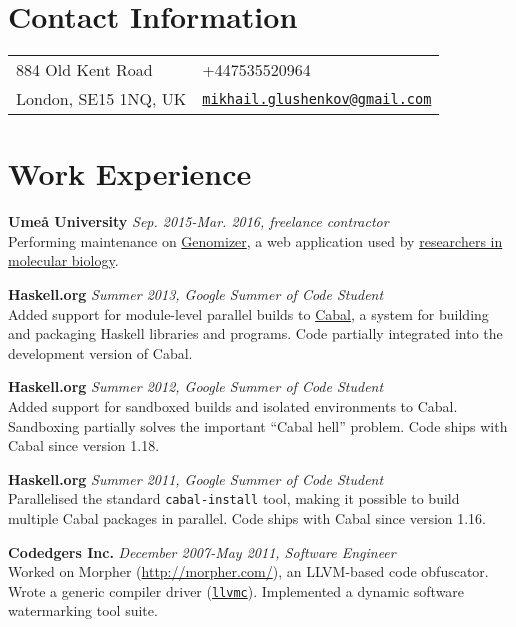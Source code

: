 \documentclass[margin,line]{res}
\begin{document}

\begin{resume}
\section{\sc Contact Information}
\vspace{.05in}
\begin{tabular}{@{}p{2in}p{4in}}
884 Old Kent Road&
+447535520964\\
London, SE15 1NQ, UK&
\href{mailto:mikhail.glushenkov@gmail.com}
{\texttt{mikhail.glushenkov@gmail.com}}\\
\end{tabular}

\section{\sc Work Experience}

{\bf Umeå University} \hfill {\it Sep. 2015-Mar. 2016, freelance contractor}\\
Performing maintenance on \href{https://github.com/genomizer}{Genomizer}, a web
application used by \href{http://www.epicon.nu}{researchers in molecular biology}.

{\bf Haskell.org} \hfill {\it Summer 2013, Google Summer of Code Student}\\
Added support for module-level parallel builds to
\href{http://haskell.org/cabal}{Cabal}, a system for building and packaging
Haskell libraries and programs. Code partially integrated into the development
version of Cabal.

{\bf Haskell.org} \hfill {\it Summer 2012, Google Summer of Code Student}\\
Added support for sandboxed builds and isolated environments to
Cabal. Sandboxing partially solves the important ``Cabal hell'' problem. Code
ships with Cabal since version 1.18.

{\bf Haskell.org} \hfill {\it Summer 2011, Google Summer of Code Student}\\
Parallelised the standard \texttt{cabal-install} tool, making it possible to
build multiple Cabal packages in parallel. Code ships with Cabal since version
1.16.

{\bf Codedgers Inc.} \hfill {\it December 2007-May 2011, Software Engineer}\\
Worked on Morpher (\url{http://morpher.com/}), an LLVM-based code
obfuscator. Wrote a generic compiler driver
(\href{http://llvm.org/releases/2.9/docs/CompilerDriver.html}{\texttt{llvmc}}). Implemented
a dynamic software watermarking tool suite.


\end{resume}
\end{document}

